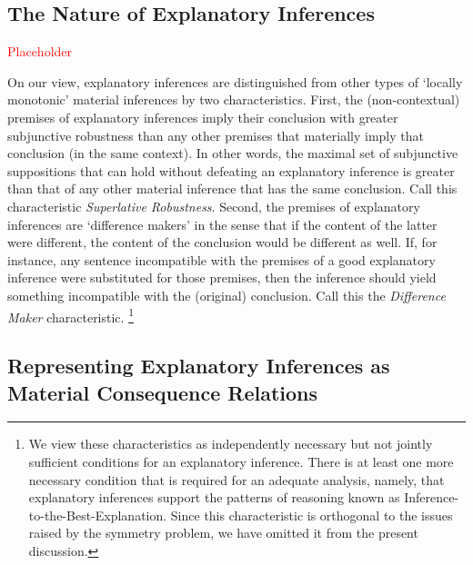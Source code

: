 \documentclass{svjour3}                     %
\begin{document}
\subsection{The Nature of Explanatory Inferences}

\textcolor{red}{Placeholder}

On our view, explanatory inferences are distinguished from other types of `locally monotonic' material inferences by two characteristics. First, the (non-contextual) premises of explanatory inferences imply their conclusion with greater subjunctive robustness than any other premises that materially imply that conclusion (in the same context). In other words, the maximal set of subjunctive suppositions that can hold without defeating an explanatory inference is greater than that of any other material inference that has the same conclusion. Call this characteristic \textit{Superlative Robustness}. Second, the premises of explanatory inferences are `difference makers' in the sense that if the content of the latter were different, the content of the conclusion would be different as well. If, for instance, any sentence incompatible with the premises of a good explanatory inference were substituted for those premises, then the inference should yield something incompatible with the (original) conclusion.   Call this the \textit{Difference Maker} characteristic. \footnote{We view these characteristics as independently necessary but not jointly sufficient conditions for an explanatory inference. There is at least one more necessary condition that is required for an adequate analysis, namely, that explanatory inferences support the patterns of reasoning  known as Inference-to-the-Best-Explanation. Since this characteristic is orthogonal to the issues raised by the symmetry problem, we have omitted it from the present discussion.} 

\subsection{Representing Explanatory Inferences as Material Consequence Relations}
\end{document}
